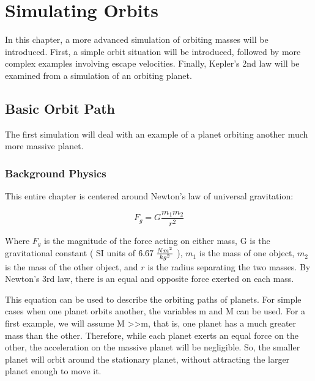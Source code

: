 
\chapter{Simulating Orbits} %

\label{Chapter2} %



In this chapter, a more advanced simulation of orbiting masses will be introduced.  First, a simple orbit situation will be introduced, followed by more complex examples involving escape velocities.  Finally, Kepler's 2nd law will be examined from a simulation of an orbiting planet.


\section{Basic Orbit Path}

The first simulation will deal with an example of a planet orbiting another much more massive planet.  

\subsection{Background Physics}



This entire chapter is centered around Newton's law of universal gravitation:

\begin{equation}\label{universalgravity}
F_g = G \frac{m_1 m_2}{r^2} 
\end{equation}

Where $F_g$ is the magnitude of the force acting on either mass, G is the gravitational constant ( SI units of $6.67 \hspace{1mm} \frac{Nm^2}{kg^2}$ ), $m_1$ is the mass of one object, $m_2$ is the mass of the other object, and $r$ is the radius separating the two masses.  By Newton's 3rd law, there is an equal and opposite force exerted on each mass.  

This equation can be used to describe the orbiting paths of planets.  For simple cases when one planet orbits another, the variables m and M can be used.  For a first example, we will assume M \textgreater \textgreater  m, that is, one planet has a much greater mass than the other.  Therefore, while each planet exerts an equal force on the other, the acceleration on the massive planet will be negligible.  So, the smaller planet will orbit around the stationary planet, without attracting the larger planet enough to move it.  




